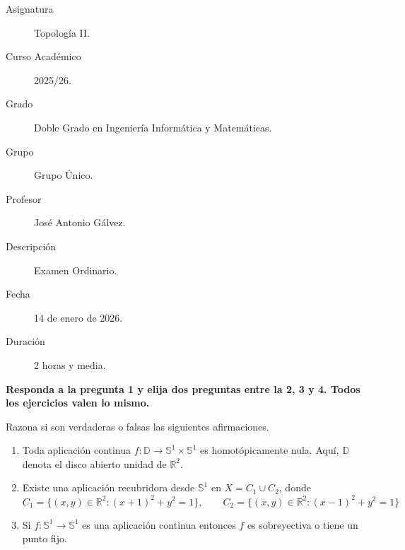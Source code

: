 \documentclass[12pt]{article}
\begin{document}

    
    

    \begin{description}
        \item[Asignatura] Topología II.
        \item[Curso Académico] 2025/26.
        \item[Grado] Doble Grado en Ingeniería Informática y Matemáticas.
        \item[Grupo] Grupo Único.
        \item[Profesor] José Antonio Gálvez.
        \item[Descripción] Examen Ordinario.
        \item[Fecha] 14 de enero de 2026.
        \item[Duración] 2 horas y media.
    \end{description}
    \newpage



    \noindent
    \textbf{Responda a la pregunta 1 y elija dos preguntas entre la 2, 3 y 4. Todos los ejercicios valen lo mismo.}

    \begin{ejercicio}
        Razona si son verdaderas o falsas las siguientes afirmaciones.
        \begin{enumerate}[label=\alph*)]
            \item Toda aplicación continua $f:\mathbb{D}\to \mathbb{S}^1\times\mathbb{S}^1$ es homotópicamente nula. Aquí, $\mathbb{D}$ denota el disco abierto unidad de $\mathbb{R}^2$.
            \item Existe una aplicación recubridora desde $\mathbb{S}^1$ en $X=C_1\cup C_2$, donde
                \begin{equation*}
                    C_1 = \{(x,y)\in \mathbb{R}^2: {(x+1)}^{2}+y^2 = 1\}, \qquad C_2 = \{(x,y)\in \mathbb{R}^2 : {(x-1)}^{2}+y^2 = 1\}
                \end{equation*}
            \item Si $f:\mathbb{S}^1\to \mathbb{S}^1$ es una aplicación continua entonces $f$ es sobreyectiva o tiene un punto fijo.
        \end{enumerate}
    \end{ejercicio}
\end{document}
